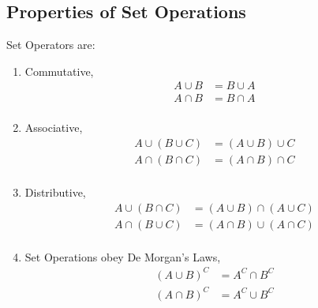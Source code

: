 	\subsection{Properties of Set Operations} \label{subsec:Properties of Set Ops}
	Set Operators are:
	\begin{enumerate}
		\item Commutative, 
			\begin{equation} %
				\begin{aligned}
					A \cup B &= B \cup A \\
					A \cap B &= B \cap A \\
				\end{aligned}
				\label{eq:Set Ops-Commutative}
			\end{equation}
			
			\item Associative,
				\begin{equation} %
					\begin{aligned}
						A \cup \left( B \cup C \right) &= \left( A \cup B \right) \cup C \\
						A \cap \left( B \cap C \right) &= \left( A \cap B \right) \cap C \\
					\end{aligned}
					\label{eq:Set Ops-Associative}
				\end{equation}
			
			\item Distributive, 
				\begin{equation} %
					\begin{aligned}
						A \cup \left( B \cap C \right) &= \left( A \cup B \right) \cap \left( A \cup C \right) \\
						A \cap \left( B \cup C \right) &= \left( A \cap B \right) \cup \left( A \cap C \right) \\
					\end{aligned}
					\label{eq:Set Ops-Distributive}
				\end{equation}
			
			\item Set Operations obey De Morgan's Laws, 
				\begin{equation} %
					\begin{aligned}
						\left( A \cup B \right)^{C} &= A^{C} \cap B^{C} \\
						\left( A \cap B \right)^{C} &= A^{C} \cup B^{C} \\
					\end{aligned}
					\label{eq:Set Ops-De Morgan's}
				\end{equation}
			
	\end{enumerate}
